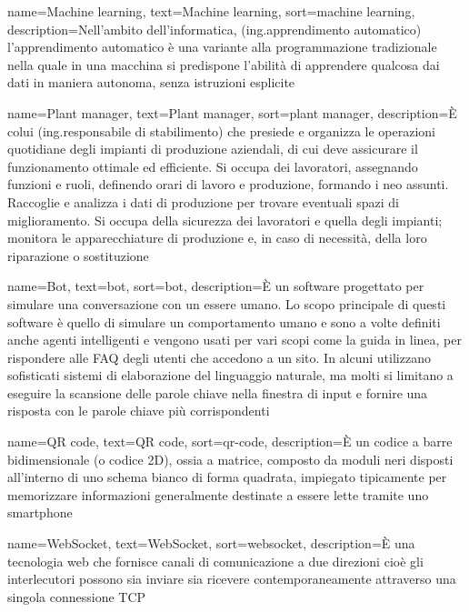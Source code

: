 {
	name={Machine learning},
	text=Machine learning,
	sort=machine learning,
	description={Nell'ambito dell'informatica, (ing.apprendimento automatico) l'apprendimento automatico è una variante alla programmazione tradizionale nella quale in una macchina si predispone l'abilità di apprendere qualcosa dai dati in maniera autonoma, senza istruzioni esplicite}
}

{
	name={Plant manager},
	text=Plant manager,
	sort=plant manager,
	description={È colui (ing.responsabile di stabilimento) che presiede e organizza le operazioni quotidiane degli impianti di produzione aziendali, di cui deve assicurare il funzionamento ottimale ed efficiente. Si occupa dei lavoratori, assegnando funzioni e ruoli, definendo orari di lavoro e produzione, formando i neo assunti. Raccoglie e analizza i dati di produzione per trovare eventuali spazi di miglioramento. Si occupa della sicurezza dei lavoratori e quella degli impianti; monitora le apparecchiature di produzione e, in caso di necessità, della loro riparazione o sostituzione}
}

{
	name={Bot},
	text=bot,
	sort=bot,
	description={È un software progettato per simulare una conversazione con un essere umano. Lo scopo principale di questi software è quello di simulare un comportamento umano e sono a volte definiti anche agenti intelligenti e vengono usati per vari scopi come la guida in linea, per rispondere alle FAQ degli utenti che accedono a un sito. In alcuni utilizzano sofisticati sistemi di elaborazione del linguaggio naturale, ma molti si limitano a eseguire la scansione delle parole chiave nella finestra di input e fornire una risposta con le parole chiave più corrispondenti}
}

{
	name={QR code},
	text=QR code,
	sort=qr-code,
	description={È un codice a barre bidimensionale (o codice 2D), ossia a matrice, composto da moduli neri disposti all'interno di uno schema bianco di forma quadrata, impiegato tipicamente per memorizzare informazioni generalmente destinate a essere lette tramite uno smartphone}
}

{
	name={WebSocket},
	text=WebSocket,
	sort=websocket,
	description={È una tecnologia web che fornisce canali di comunicazione a due direzioni cioè gli interlecutori possono sia inviare sia ricevere contemporaneamente attraverso una singola connessione TCP}
}


